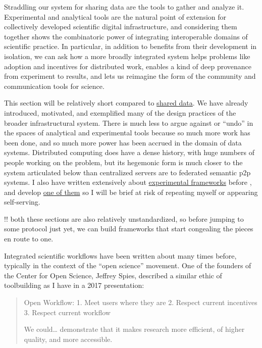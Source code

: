 \documentclass[10pt]{article}
\begin{document}
\begin{multicols}{2}
 Straddling our system for sharing data are the tools to
gather and analyze it. Experimental and analytical tools are the natural
point of extension for collectively developed scientific digital
infrastructure, and considering them together shows the combinatoric
power of integrating interoperable domains of scientific practice. In
particular, in addition to benefits from their development in isolation,
we can ask how a more broadly integrated system helps problems like
adoption and incentives for distributed work, enables a kind of deep
provenance from experiment to results, and lets us reimagine the form of
the community and communication tools for science.

This section will be relatively short compared to
\protect\hyperlink{shared-data}{shared data}. We have already
introduced, motivated, and exemplified many of the design practices of
the broader infrastructural system. There is much less to argue against
or ``undo'' in the spaces of analytical and experimental tools because
so much more work has been done, and so much more power has been accrued
in the domain of data systems. Distributed computing does have a dense
history, with huge numbers of people working on the problem, but its
hegemonic form is much closer to the system articulated below than
centralized servers are to federated semantic p2p systems. I also have
written extensively about
\protect\hyperlink{experimental-frameworks}{experimental frameworks}
before \cite{saundersAutopilotAutomatingBehavioral2019} , and
develop \href{https://docs.auto-pi-lot.com/en/latest/}{one of them} so I
will be brief at risk of repeating myself or appearing self-serving.

!! both these sections are also relatively unstandardized, so before
jumping to some protocol just yet, we can build frameworks that start
congealing the pieces en route to one.

Integrated scientific workflows have been written about many times
before, typically in the context of the ``open science'' movement. One
of the founders of the Center for Open Science, Jeffrey Spies, described
a similar ethic of toolbuilding as I have in a 2017 presentation:

\begin{quote}
Open Workflow: 1. Meet users where they are 2. Respect current
incentives 3. Respect current workflow

We could\ldots{} demonstrate that it makes research more efficient, of
higher quality, and more accessible.


\end{quote}
\end{multicols}
\end{document}
